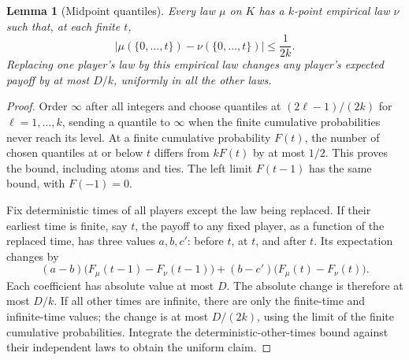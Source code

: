 \documentclass[11pt,a4paper]{article}
\newtheorem{lemma}[theorem]{Lemma}
\theoremstyle{definition}
\theoremstyle{remark}
\begin{document}
\begin{lemma}[Midpoint quantiles]
Every law $\mu$ on $K$ has a $k$-point empirical law $\nu$ such that, at each finite $t$,
\[
 |\mu(\{0,\ldots,t\})-\nu(\{0,\ldots,t\})|\leq\frac1{2k}.
\]
Replacing one player's law by this empirical law changes any player's expected payoff by at most $D/k$, uniformly in all the other laws.
\end{lemma}
\begin{proof}
Order $\infty$ after all integers and choose quantiles at $(2\ell-1)/(2k)$ for $\ell=1,\ldots,k$, sending a quantile to $\infty$ when the finite cumulative probabilities never reach its level. At a finite cumulative probability $F(t)$, the number of chosen quantiles at or below $t$ differs from $kF(t)$ by at most $1/2$. This proves the bound, including atoms and ties. The left limit $F(t-1)$ has the same bound, with $F(-1)=0$.

Fix deterministic times of all players except the law being replaced. If their earliest time is finite, say $t$, the payoff to any fixed player, as a function of the replaced time, has three values $a,b,c'$: before $t$, at $t$, and after $t$. Its expectation changes by
\[
 (a-b)\bigl(F_\mu(t-1)-F_\nu(t-1)\bigr)
 +(b-c')\bigl(F_\mu(t)-F_\nu(t)\bigr).
\]
Each coefficient has absolute value at most $D$. The absolute change is therefore at most $D/k$. If all other times are infinite, there are only the finite-time and infinite-time values; the change is at most $D/(2k)$, using the limit of the finite cumulative probabilities. Integrate the deterministic-other-times bound against their independent laws to obtain the uniform claim.
\end{proof}
\end{document}
